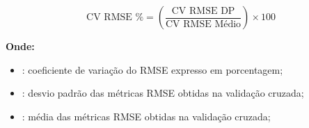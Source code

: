\documentclass{article}
\begin{document}
    \begin{equation}
        \text{CV RMSE \%} = \left( \frac{\text{CV RMSE DP}}{\text{CV RMSE Médio}} \right) \times 100
    \end{equation}
    
    \begin{flushleft}
    \textbf{Onde:}
    \begin{itemize}
        \item {}: coeficiente de variação do RMSE expresso em porcentagem;
        \item {}: desvio padrão das métricas RMSE obtidas na validação cruzada;
        \item {}: média das métricas RMSE obtidas na validação cruzada;
    \end{itemize}
    \end{flushleft}
\end{document}
